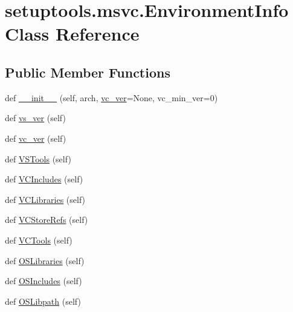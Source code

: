 \hypertarget{classsetuptools_1_1msvc_1_1EnvironmentInfo}{}\section{setuptools.\+msvc.\+Environment\+Info Class Reference}
\label{classsetuptools_1_1msvc_1_1EnvironmentInfo}
\subsection*{Public Member Functions}
\begin{DoxyCompactItemize}
\item 
def \hyperlink{classsetuptools_1_1msvc_1_1EnvironmentInfo_aadd626f118e5f34282667e8abf966a1f}{\+\_\+\+\_\+init\+\_\+\+\_\+} (self, arch, \hyperlink{classsetuptools_1_1msvc_1_1EnvironmentInfo_aa769874f258713a660628e8e8abf92d0}{vc\+\_\+ver}=None, vc\+\_\+min\+\_\+ver=0)
\item 
def \hyperlink{classsetuptools_1_1msvc_1_1EnvironmentInfo_a66fc0422e9a631b03ca921b2febc9a2d}{vs\+\_\+ver} (self)
\item 
def \hyperlink{classsetuptools_1_1msvc_1_1EnvironmentInfo_aa769874f258713a660628e8e8abf92d0}{vc\+\_\+ver} (self)
\item 
def \hyperlink{classsetuptools_1_1msvc_1_1EnvironmentInfo_a942785692dbd53f81650af2a9c18e0ff}{V\+S\+Tools} (self)
\item 
def \hyperlink{classsetuptools_1_1msvc_1_1EnvironmentInfo_a01956a4af56037f7bc86f061ca57ed59}{V\+C\+Includes} (self)
\item 
def \hyperlink{classsetuptools_1_1msvc_1_1EnvironmentInfo_a801f70fc7fcfdee61534e8ffa5153eb2}{V\+C\+Libraries} (self)
\item 
def \hyperlink{classsetuptools_1_1msvc_1_1EnvironmentInfo_ae133809f045deeb9edfa3641ddeda5fd}{V\+C\+Store\+Refs} (self)
\item 
def \hyperlink{classsetuptools_1_1msvc_1_1EnvironmentInfo_a564e72c39cd5aced619098af952cca3d}{V\+C\+Tools} (self)
\item 
def \hyperlink{classsetuptools_1_1msvc_1_1EnvironmentInfo_a30bd88ece6b2e0a18d05a4f746a1ba2f}{O\+S\+Libraries} (self)
\item 
def \hyperlink{classsetuptools_1_1msvc_1_1EnvironmentInfo_a5dd42b70389abbceecb4675fa4669cd7}{O\+S\+Includes} (self)
\item 
def \hyperlink{classsetuptools_1_1msvc_1_1EnvironmentInfo_ac0bfd6c2e533ac3db2b4fb30feb97349}{O\+S\+Libpath} (self)

\end{DoxyCompactItemize}
